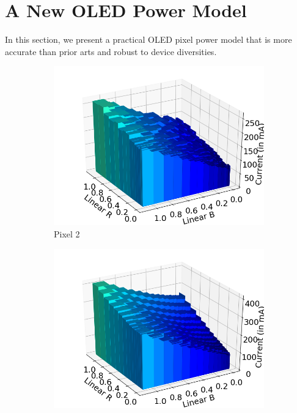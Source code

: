 \section{A New OLED Power Model}
\label{sec:newmodel}

In this section, we present a practical OLED pixel power model that
is more accurate than prior arts and robust to device diversities.

\begin{figure}[tp]
	\begin{subfigure}[]{0.28\textwidth}
		\includegraphics[width=\textwidth]{figure/002_Pixel2_monotonicity_cube.png}
		\caption{Pixel 2}
		\label{fig:initial_monotonicity_n6_w}
	\end{subfigure}
	\hfill
	\begin{subfigure}[]{0.28\textwidth}
		\includegraphics[width=\textwidth]{figure/003_MotoZ3_monotonicity_cube.png}

\end{subfigure}
\end{figure}
